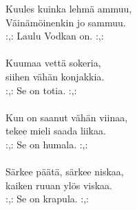 
            Kuules kuinka lehmä ammuu, \\
            Väinämöinenkin jo sammuu. \\
            :,: Laulu Vodkan on. :,: \\
\hspace{10mm} \\
            Kuumaa vettä sokeria, \\
            siihen vähän konjakkia. \\
            :,: Se on totia. :,: \\
\hspace{10mm} \\
            Kun on saanut vähän viinaa, \\
            tekee mieli saada liikaa. \\
            :,: Se on humala. :,: \\
\hspace{10mm} \\
            Särkee päätä, särkee niskaa, \\
            kaiken ruuan ylös viskaa. \\
            :,: Se on krapula. :,: \\
